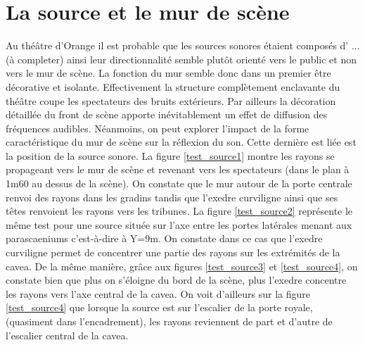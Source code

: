 \section{La source et le mur de scène}

Au théâtre d'Orange il est probable que les sources sonores étaient composés d' ... (à completer)
ainsi leur directionnalité semble plutôt orienté vers le public et non vers le mur de scène. La fonction du mur semble donc dans un premier être décorative et isolante. Effectivement la structure complètement enclavante du théâtre coupe les spectateurs des bruits extérieurs. Par ailleurs la décoration détaillée du front de scène apporte inévitablement un effet de diffusion des  fréquences audibles. Néanmoins, on peut explorer l'impact de la forme caractéristique du mur de scène sur la réflexion du son. Cette dernière est liée est la position de la source sonore. La figure \ref{test_source1} montre les rayons se propageant vers le mur de scène et revenant vers les spectateurs (dans le plan à 1m60 au dessus de la scène). On constate que le mur autour de la porte centrale renvoi des rayons dans les gradins tandis que l'\gls{exedre} curviligne ainsi que ses têtes renvoient les rayons vers les tribunes. La figure \ref{test_source2} représente le même test pour une source située sur l'axe entre les portes latérales menant aux \glspl{parascaenium} c'est-à-dire à Y=9m. On constate dans ce cas que l'\gls{exedre} curviligne permet de concentrer une partie des rayons sur les extrémités de la \gls{cavea}. De la même manière, grâce aux figures \ref{test_source3} et \ref{test_source4}, on constate bien que plus on s'éloigne du bord de la scène, plus l'\gls{exedre} concentre les rayons vers l'axe central de la \gls{cavea}. On voit d'ailleurs sur la figure \ref{test_source4} que lorsque la source est sur l'escalier de la porte royale, (quasiment dans l'encadrement), les rayons reviennent de part et d'autre de l'escalier central de la \gls{cavea}. 

